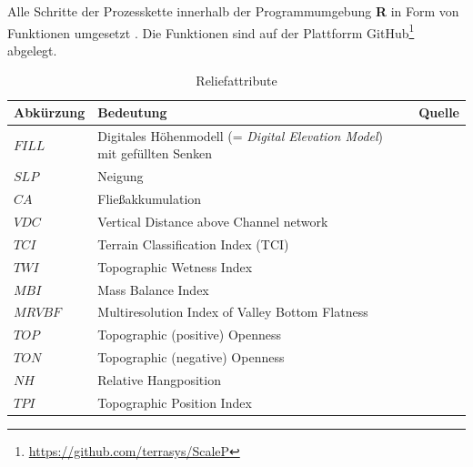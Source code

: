 Alle Schritte der Prozesskette innerhalb der Programmumgebung \textbf{R} in Form von Funktionen umgesetzt  \citep{R2018}. Die  Funktionen sind auf der Plattforrm GitHub\footnote{\url{https://github.com/terrasys/ScaleP}} abgelegt.


\begin{table}[t]
	\centering
	\caption{Reliefattribute}\label{tab:terrainattributes}
	\begin{tabularx}{\textwidth}{l|X|X}
		\toprule
		Abkürzung & Bedeutung & Quelle\\
		\midrule
		$FILL$   & Digitales Höhenmodell  (= \textit{Digital Elevation Model}) mit gefüllten Senken &  \citep{PlanchonDarboux2001catena}\\\midrule
		$SLP$   & Neigung &  \citet{ZevenbergenThorne1987espl}\\\midrule
		$CA$   & Fließakkumulation &  \citet{Quinn-etal1991hp}\\\midrule
		$VDC$   & Vertical Distance above Channel network  &  \\\midrule
		$TCI$   & Terrain Classification Index (TCI) & \citet{Bock-etal2007saga}\\\midrule
		$TWI$   & Topographic Wetness Index &  \citet{BevenKirkby1979hsb}\\\midrule
		$MBI$   & Mass Balance Index &  \citet{Moeller-etal2008jpnss,Moeller-etal2012catena,MoellerVolk2015geoderma}\\\midrule
		$MRVBF$ & Multiresolution Index of Valley Bottom Flatness &  \citet{GallantDowling2003wrr}\\\midrule
		$TOP$   & Topographic (positive) Openness &  \citet{Yokoyama-etal2002pers}\\\midrule
	    $TON$   & Topographic (negative) Openness &  \citet{Yokoyama-etal2002pers}\\\midrule
		$NH$   & Relative Hangposition &  \citet{BoehnerSelige2006saga}\\\midrule
		$TPI$   & Topographic Position Index &  \citet{Guisan-etal1999pe}\\\bottomrule
	\end{tabularx}
\end{table}

